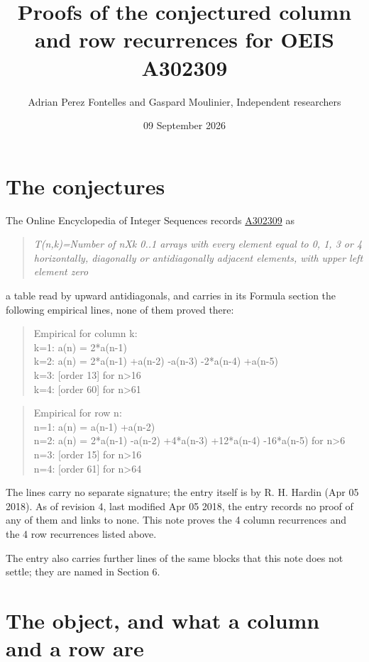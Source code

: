 \documentclass[11pt]{article}
\title{Proofs of the conjectured column and row recurrences for OEIS A302309}
\author{Adrian Perez Fontelles and Gaspard Moulinier, Independent researchers}
\date{09 September 2026}
\theoremstyle{definition}
\begin{document}
\maketitle
\section{The conjectures}

The Online Encyclopedia of Integer Sequences records \href{https://oeis.org/A302309}{A302309} as

\begin{quote}\itshape T(n,k)=Number of nXk 0..1 arrays with every element equal to 0, 1, 3 or 4 horizontally, diagonally or antidiagonally adjacent elements, with upper left element zero\end{quote}

a table read by upward antidiagonals, and carries in its Formula section the following empirical lines, none of them proved there:

\begin{quote}\ttfamily Empirical for column k:\\
k=1: a(n) = 2*a(n-1)\\k=2: a(n) = 2*a(n-1) +a(n-2) -a(n-3) -2*a(n-4) +a(n-5)\\k=3: [order 13] for n>16\\k=4: [order 60] for n>61\end{quote}

\begin{quote}\ttfamily Empirical for row n:\\
n=1: a(n) = a(n-1) +a(n-2)\\n=2: a(n) = 2*a(n-1) -a(n-2) +4*a(n-3) +12*a(n-4) -16*a(n-5) for n>6\\n=3: [order 15] for n>16\\n=4: [order 61] for n>64\end{quote}

The lines carry no separate signature; the entry itself is by R. H. Hardin (Apr 05 2018). As of revision 4, last modified Apr 05 2018, the entry records no proof of any of them and links to none. This note proves the 4 column recurrences and the 4 row recurrences listed above.

The entry also carries further lines of the same blocks that this note does not settle; they are named in Section 6.

\section{The object, and what a column and a row are}
\end{document}
